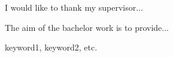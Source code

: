 \documentclass[12pt,oneside,draft]{fithesis2}
\begin{document}
  
\FrontMatter  
\ThesisTitlePage  
 
\begin{ThesisDeclaration}  
\DeclarationText  
\AdvisorName  
\end{ThesisDeclaration}  
 
\begin{ThesisThanks}  
I would like to thank my supervisor...  
\end{ThesisThanks}  
 
\begin{ThesisAbstract}  
The aim of the bachelor work is to provide...  
\end{ThesisAbstract}  
 
\begin{ThesisKeyWords}  
keyword1, keyword2, etc.  
\end{ThesisKeyWords}  
 
\MainMatter  
\tableofcontents          %
 







 
\nocite{*}
 
\end{document}
